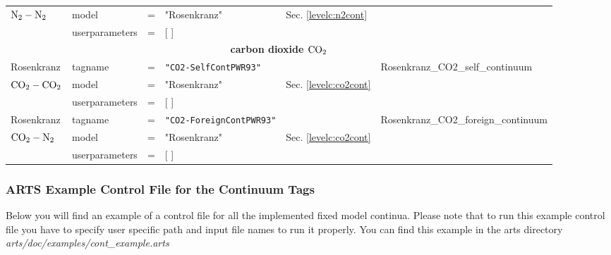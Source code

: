 \begin{landscape}
\begin{longtable}{llllll}
$\mbox{N}_2-\mbox{N}_2$   & model &=& "Rosenkranz" &  {\small Sec. \ref{levelc:n2cont}} &  \\ 
            & userparameters &=& [ ] &   & \\
 \hline
 \multicolumn{6}{c}{{\bf carbon dioxide $\mbox{CO}_2$}}\\
 \hline
 Rosenkranz & tagname &=& {\small \tt "CO2-SelfContPWR93"} & {\small \citet{pwr:93}} & 
              {\small Rosenkranz\_CO2\_self\_continuum}\\
$\mbox{CO}_2-\mbox{CO}_2$ & model &=& "Rosenkranz" &   {\small Sec. \ref{levelc:co2cont}} &  \\  
            & userparameters &=& [ ] &   & \\

 Rosenkranz & tagname &=& {\small \tt "CO2-ForeignContPWR93"} & {\small \citet{pwr:93}} & 
              {\small Rosenkranz\_CO2\_foreign\_continuum}\\
$\mbox{CO}_2-\mbox{N}_2$  & model &=& "Rosenkranz" &  {\small Sec. \ref{levelc:co2cont}}  &  \\  
            & userparameters &=& [ ] &   & \\

 \hline
 \end{longtable}
 \setlength{\LTcapwidth}{0.8\textwidth}
\end{landscape}



\subsubsection{ARTS Example Control File for the Continuum Tags}
\label{leveld:ArtsContExampleControlFile}
Below you will find an example of a control file for all 
the implemented fixed model continua. Please note that
to run this example control file you have to specify
user specific path and input file names to run it 
properly. You can find this example in the arts directory 
{\it arts/doc/examples/cont\_example.arts}



\begin{flushleft}
\end{flushleft}
\begin{flushleft}
\end{flushleft}
\begin{flushleft}
\end{flushleft}



